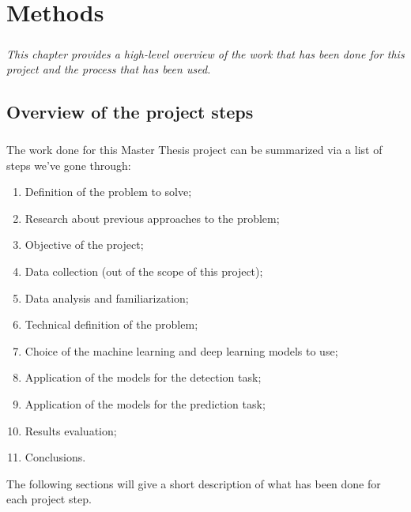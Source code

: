 
\chapter{Methods} \label{chap: methods}

\paragraph{} \textit{This chapter provides a high-level overview of the work that has been done for this project and the process that has been used.}


\section{Overview of the project steps} \label{sec: overview_project_steps}
\paragraph{} The work done for this Master Thesis project can be summarized via a list of steps we've gone through:
\begin{enumerate}
    \item Definition of the problem to solve;
    \item Research about previous approaches to the problem;
    \item Objective of the project;
    \item Data collection (out of the scope of this project);
    \item Data analysis and familiarization;
    \item Technical definition of the problem;
    \item Choice of the machine learning and deep learning models to use;
    \item Application of the models for the detection task;
    \item Application of the models for the prediction task;
    \item Results evaluation;
    \item Conclusions.
\end{enumerate}
The following sections will give a short description of what has been done for each project step.

